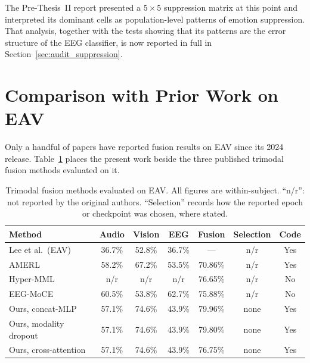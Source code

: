 The Pre-Thesis~II report presented a $5\times5$ suppression matrix at this point and interpreted its dominant cells as population-level patterns of emotion suppression. That analysis, together with the tests showing that its patterns are the error structure of the EEG classifier, is now reported in full in Section~\ref{sec:audit_suppression}.

\section{Comparison with Prior Work on EAV}
\label{sec:eav_prior_comparison}

Only a handful of papers have reported fusion results on EAV \cite{Lee2024EAV} since its 2024 release. Table~\ref{tab:eav_prior_comparison} places the present work beside the three published trimodal fusion methods evaluated on it.

\begin{table}[htbp]
\centering
\caption{Trimodal fusion methods evaluated on EAV. All figures are within-subject. ``n/r'': not reported by the original authors. ``Selection'' records how the reported epoch or checkpoint was chosen, where stated.}
\label{tab:eav_prior_comparison}
\small
\begin{tabular}{p{3.7cm} c c c c c c}
\hline
\textbf{Method} & \textbf{Audio} & \textbf{Vision} & \textbf{EEG} & \textbf{Fusion} & \textbf{Selection} & \textbf{Code} \\
\hline
Lee et al.\ (EAV) \cite{Lee2024EAV}     & 36.7\% & 52.8\% & 36.7\% & ---      & n/r & Yes \\
AMERL \cite{Yin2024AMERL}               & 58.2\% & 67.2\% & 53.5\% & 70.86\%  & n/r & Yes \\
Hyper-MML \cite{Kang2025HyperMML}       & n/r    & n/r    & n/r    & 76.65\%  & n/r & No \\
EEG-MoCE \cite{Anon2026EEGMoCE}         & 60.5\% & 53.8\% & 62.7\% & 75.88\%  & n/r & No \\
\hline
Ours, concat-MLP                        & 57.1\% & 74.6\% & 43.9\% & 79.96\%  & none & Yes \\
Ours, modality dropout                  & 57.1\% & 74.6\% & 43.9\% & 79.80\%  & none & Yes \\
Ours, cross-attention                   & 57.1\% & 74.6\% & 43.9\% & 76.75\%  & none & Yes \\
\hline
\end{tabular}
\end{table}

